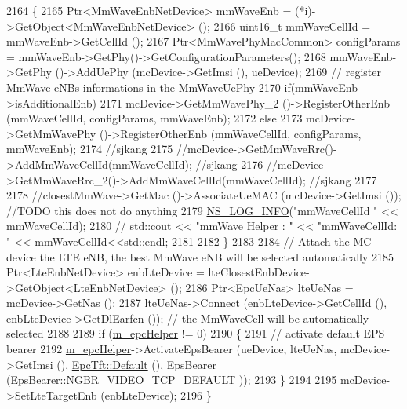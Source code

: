 \begin{DoxyCode}
2164         \{
2165                 Ptr<MmWaveEnbNetDevice> mmWaveEnb = (*i)->GetObject<MmWaveEnbNetDevice> (); 
2166                 uint16\_t mmWaveCellId = mmWaveEnb->GetCellId ();
2167                 Ptr<MmWavePhyMacCommon> configParams = mmWaveEnb->GetPhy()->GetConfigurationParameters();
2168                 mmWaveEnb->GetPhy ()->AddUePhy (mcDevice->GetImsi (), ueDevice);
2169                 \textcolor{comment}{// register MmWave eNBs informations in the MmWaveUePhy}
2170                 \textcolor{keywordflow}{if}(mmWaveEnb->isAdditionalEnb)
2171                 mcDevice->GetMmWavePhy\_2 ()->RegisterOtherEnb (mmWaveCellId, configParams, mmWaveEnb);
2172                 \textcolor{keywordflow}{else}
2173                 mcDevice->GetMmWavePhy ()->RegisterOtherEnb (mmWaveCellId, configParams, mmWaveEnb);
2174                  \textcolor{comment}{//sjkang}
2175                 \textcolor{comment}{//mcDevice->GetMmWaveRrc()->AddMmWaveCellId(mmWaveCellId); //sjkang}
2176                 \textcolor{comment}{//mcDevice->GetMmWaveRrc\_2()->AddMmWaveCellId(mmWaveCellId); //sjkang}
2177 
2178                 \textcolor{comment}{//closestMmWave->GetMac ()->AssociateUeMAC (mcDevice->GetImsi ()); //TODO this does not do
       anything}
2179                 \hyperlink{group__logging_gafbd73ee2cf9f26b319f49086d8e860fb}{NS\_LOG\_INFO}(\textcolor{stringliteral}{"mmWaveCellId "} << mmWaveCellId);
2180         \textcolor{comment}{//      std::cout  << "mmWave Helper : " << "mmWaveCellId: " << mmWaveCellId<<std::endl;}
2181 
2182         \}
2183         
2184         \textcolor{comment}{// Attach the MC device the LTE eNB, the best MmWave eNB will be selected automatically}
2185         Ptr<LteEnbNetDevice> enbLteDevice = lteClosestEnbDevice->GetObject<LteEnbNetDevice> ();
2186         Ptr<EpcUeNas> lteUeNas = mcDevice->GetNas ();
2187         lteUeNas->Connect (enbLteDevice->GetCellId (), enbLteDevice->GetDlEarfcn ()); \textcolor{comment}{// the MmWaveCell
       will be automatically selected}
2188 
2189         \textcolor{keywordflow}{if} (\hyperlink{classns3_1_1MmWaveHelper_a03b33f9a2480a4cdd8ffe697ccc08e9e}{m\_epcHelper} != 0)
2190         \{
2191           \textcolor{comment}{// activate default EPS bearer}
2192           \hyperlink{classns3_1_1MmWaveHelper_a03b33f9a2480a4cdd8ffe697ccc08e9e}{m\_epcHelper}->ActivateEpsBearer (ueDevice, lteUeNas, mcDevice->GetImsi (), 
      \hyperlink{classns3_1_1EpcTft_a48c099da249ba99152c2e597c864e155}{EpcTft::Default} (), EpsBearer (\hyperlink{structns3_1_1EpsBearer_aecf0c67109c5eb4ec0b07226fff5885ea0e7232f1a6148d754be3a3d9e425d452}{EpsBearer::NGBR\_VIDEO\_TCP\_DEFAULT}
      ));
2193         \}
2194 
2195         mcDevice->SetLteTargetEnb (enbLteDevice);       
2196 \}
\end{DoxyCode}


